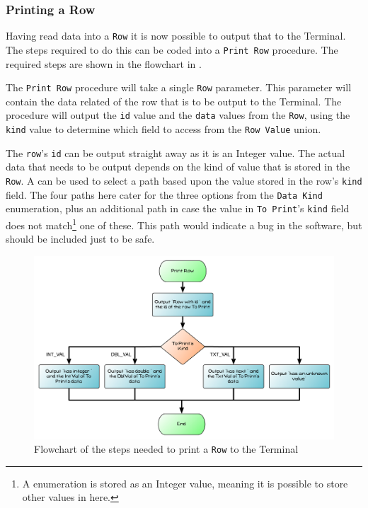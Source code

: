 \clearpage
\subsubsection{Printing a Row} %
\label{ssub:printing_a_row}

Having read data into a \texttt{Row} it is now possible to output that to the Terminal. The steps required to do this can be coded into a \texttt{Print Row} procedure. The required steps are shown in the flowchart in .

The \texttt{Print Row} procedure will take a single \texttt{Row} parameter. This parameter will contain the data related of the row that is to be output to the Terminal. The procedure will output the \texttt{id} value and the \texttt{data} values from the \texttt{Row}, using the \texttt{kind} value to determine which field to access from the \texttt{Row Value} union.

The \texttt{row}'s \texttt{id} can be output straight away as it is an Integer value. The actual data that needs to be output depends on the kind of value that is stored in the \texttt{Row}. A  can be used to select a path based upon the value stored in the row's \texttt{kind} field. The four paths here cater for the three options from the \texttt{Data Kind} enumeration, plus an additional path in case the value in \texttt{To Print}'s \texttt{kind} field does not match\footnote{A enumeration is stored as an Integer value, meaning it is possible to store other values in here.} one of these. This path would indicate a bug in the software, but should be included just to be safe.

\begin{figure}[htbp]
   \centering
   \includegraphics[width=\textwidth]{./topics/type-decl/diagrams/PrintRowFlow} 
   \caption{Flowchart of the steps needed to print a \texttt{Row} to the Terminal}
   \label{fig:print-row-flow}
\end{figure}

